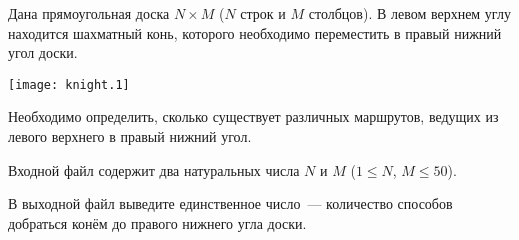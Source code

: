 

Дана прямоугольная доска $N \times M$ ($N$ строк и $M$ столбцов). В левом верхнем углу находится шахматный конь, которого необходимо переместить в правый нижний угол доски.

\centerline{\texttt{[image: knight.1]}}

Необходимо определить, сколько существует различных маршрутов, ведущих из левого верхнего
в правый нижний угол.


\InputFile
Входной файл содержит два натуральных числа $N$ и $M$ ($1 \leqslant N$, $M \leqslant 50$).


\OutputFile
В выходной файл выведите единственное число~--- количество способов добраться конём до правого нижнего угла доски.


